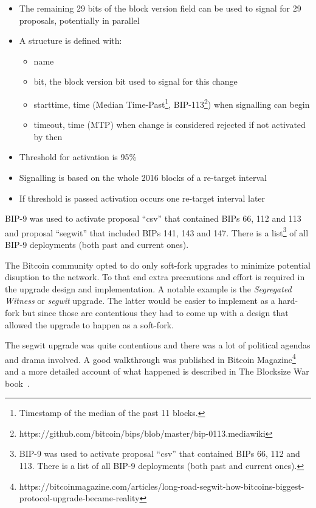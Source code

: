 \begin{itemize}
\item The remaining 29 bits of the block version field can be used to signal for 29 proposals, potentially in parallel
\item A structure is defined with:
	\begin{itemize}
	\item name
	\item bit, the block version bit used to signal for this change
	\item starttime, time (Median Time-Past\footnote{Timestamp of the median of the past 11 blocks.}, BIP-113\footnote{https://github.com/bitcoin/bips/blob/master/bip-0113.mediawiki}) when signalling can begin
	\item timeout, time (MTP) when change is considered rejected if not activated by then
	\end{itemize}
\item Threshold for activation is 95\%
\item Signalling is based on the whole 2016 blocks of a re-target interval
\item If threshold is passed activation occurs one re-target interval later
\end{itemize}

BIP-9 was used to activate proposal ``csv'' that contained BIPs 66, 112 and 113 and proposal ``segwit'' that included BIPs 141, 143 and 147. There is a list\footnote{BIP-9 was used to activate proposal “csv” that contained BIPs 66, 112 and 113. There is a list of all BIP-9 deployments (both past and current ones).} of all BIP-9 deployments (both past and current ones).

\begin{note}
The Bitcoin community opted to do only soft-fork upgrades to minimize potential disuption to the network. To that end extra precautions and effort is required in the upgrade design and implementation. A notable example is the \emph{Segregated Witness} or \emph{segwit} upgrade. The latter would be easier to implement as a hard-fork but since those are contentious they had to come up with a design that allowed the upgrade to happen as a soft-fork. 
\end{note}

The segwit upgrade was quite contentious and there was a lot of political agendas and drama involved. A good walkthrough was published in Bitcoin Magazine\footnote{https://bitcoinmagazine.com/articles/long-road-segwit-how-bitcoins-biggest-protocol-upgrade-became-reality} and a more detailed account of what happened is described in The Blocksize War book~\cite{Bier2021-blocksize-wars}.

